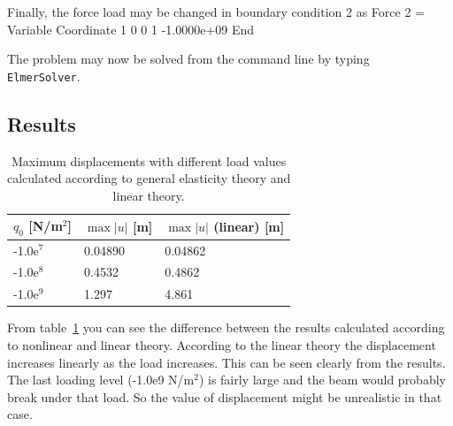 Finally, the force load may be changed in boundary condition 2 as
\ttbegin
  Force 2 = Variable Coordinate 1
      0 0
      1 -1.0000e+09
    End
\ttend

The problem may now be solved from the command line by typing {\tt
ElmerSolver}.

\subsection*{Results}

\begin{table}[tbhp]
\caption{Maximum displacements with different load values calculated according to 
general elasticity theory and linear theory.}
\label{tb:struct3b}
\begin{center}
\begin{tabular}{lll} \hline
$q_0$ [N/m$^2$] & 
$\max |u|$ [m] &
$\max |u|$ (linear) [m] \\ \hline
-1.0e$^7$ & 0.04890 & 0.04862 \\
-1.0e$^8$ & 0.4532 & 0.4862  \\
-1.0e$^9$ & 1.297  & 4.861 \\ \hline
\end{tabular}
\end{center}
\end{table}

From table~\ref{tb:struct3b} you can see the difference between the 
results calculated according to nonlinear and linear theory. According to 
the linear theory the displacement increases linearly as the load 
increases. This can be seen clearly from the results. The last loading
level (-1.0e9 N/m$^2$) is fairly large and the beam would probably break 
under that load. So the value of displacement might be unrealistic in that
case.   


\vfill
\mbox{}
